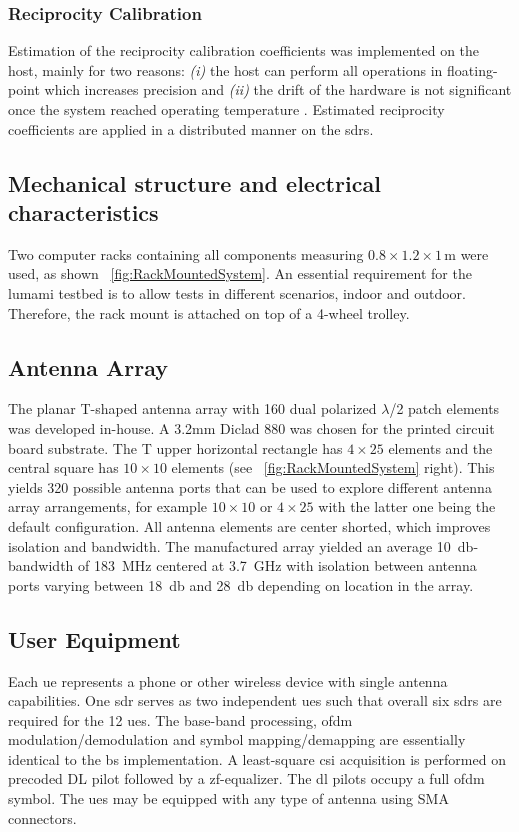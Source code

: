 \documentclass[journal]{IEEEtran}
\begin{document}
\subsubsection{Reciprocity Calibration}
Estimation of the reciprocity calibration coefficients was implemented on the host, mainly for two reasons: \emph{(i)} the host can perform all operations in floating-point which increases precision and \emph{(ii)} the drift of the hardware is not significant once the system reached operating temperature \cite{Vieira2014a}.
Estimated reciprocity coefficients are applied in a distributed manner on the \glspl{sdr}\cite{sips_steffen}.
%
%

\subsection{Mechanical structure and electrical characteristics}
\label{subsec:MecDesign}
Two computer racks containing all components measuring $0.8 \times 1.2 \times 1$\,m were used, as shown \figurename~\ref{fig:RackMountedSystem}.
An essential requirement for the \gls{lumami} testbed is to allow tests in different scenarios, \eg indoor and outdoor.
Therefore, the rack mount is attached on top of a 4-wheel trolley.
%


\subsection{Antenna Array}
\label{subsec:AntArray}
The planar T-shaped antenna array with 160 dual polarized $\lambda$/2 patch elements was developed in-house.
A 3.2\;mm Diclad 880 was chosen for the printed circuit board substrate. 
%
%
%
The T upper horizontal rectangle has $4\times25$ elements and the central square has $10\times10$ elements (see \figurename~\ref{fig:RackMountedSystem} right).
This yields 320 possible antenna ports that can be used to explore different antenna array arrangements, for example $10\times 10$ or $4\times 25$ with the latter one being the default configuration.
All antenna elements are center shorted, which improves isolation and bandwidth.
%
%
%
%
The manufactured array yielded an average \SI{10}{\decibel}-bandwidth of \SI{183}{\mega\hertz} centered at \SI{3.7}{\giga\hertz} with
%
isolation between antenna ports varying between \SI{18}{\decibel} and \SI{28}{\decibel} depending on location in the array.

\subsection{User Equipment}
Each \gls{ue} represents a phone or other wireless device with single antenna capabilities.
%
One \gls{sdr} serves as two independent \glspl{ue} such that overall six \glspl{sdr} are required for the 12 \glspl{ue}.
The base-band processing, \ie \gls{ofdm} modulation/demodulation and symbol mapping/demapping are essentially identical to the \gls{bs} implementation.
A least-square \gls{csi} acquisition is performed on precoded DL pilot followed by a \gls{zf}-equalizer.
The \gls{dl} pilots occupy a full \gls{ofdm} symbol.
%
%
The \glspl{ue} may be equipped with any type of antenna using SMA connectors.
\end{document}
